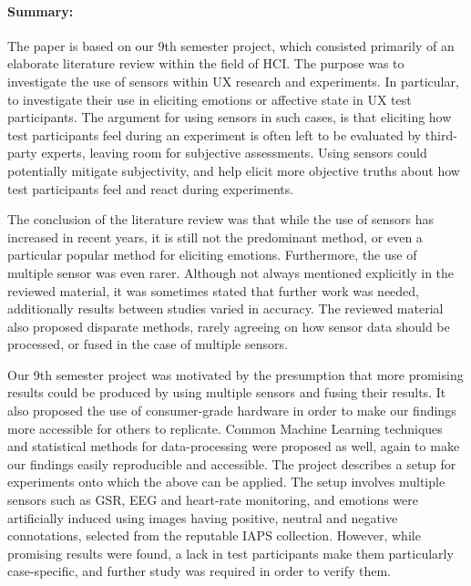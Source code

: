\paragraph{Summary:}

The paper is based on our 9th semester project, which consisted primarily of an
elaborate literature review within the field of HCI. The purpose was to
investigate the use of sensors within UX research and experiments. In
particular, to investigate their use in eliciting emotions or affective state in
UX test participants. The argument for using sensors in such cases, is that
eliciting how test participants feel during an experiment is often left to be
evaluated by third-party experts, leaving room for subjective assessments. Using
sensors could potentially mitigate subjectivity, and help elicit more objective
truths about how test participants feel and react during experiments.

The conclusion of the literature review was that while the use of sensors has increased in recent years,
it is still not the predominant method, or even a particular popular method for
eliciting emotions. Furthermore, the use of multiple sensor was even
rarer. Although not always mentioned explicitly in the reviewed material, it was
sometimes stated that further work was needed, additionally results between studies varied
in accuracy. The reviewed material also proposed disparate methods, rarely
agreeing on how sensor data should be processed, or fused in the case of
multiple sensors.

Our 9th semester project was motivated by the presumption that more promising
results could be produced by using multiple sensors and fusing their results. It
also proposed the use of consumer-grade hardware in order to make our findings
more accessible for others to replicate. Common Machine Learning techniques and statistical methods for
data-processing were proposed as well, again to make our findings easily
reproducible and accessible. The project describes a setup for experiments onto
which the above can be applied. The setup involves multiple sensors such as GSR,
EEG and heart-rate monitoring, and emotions were artificially induced using
images having positive, neutral and negative connotations, selected from the
reputable IAPS collection. However, while promising results were found, a lack
in test participants make them particularly case-specific, and further study was
required in order to verify them.

